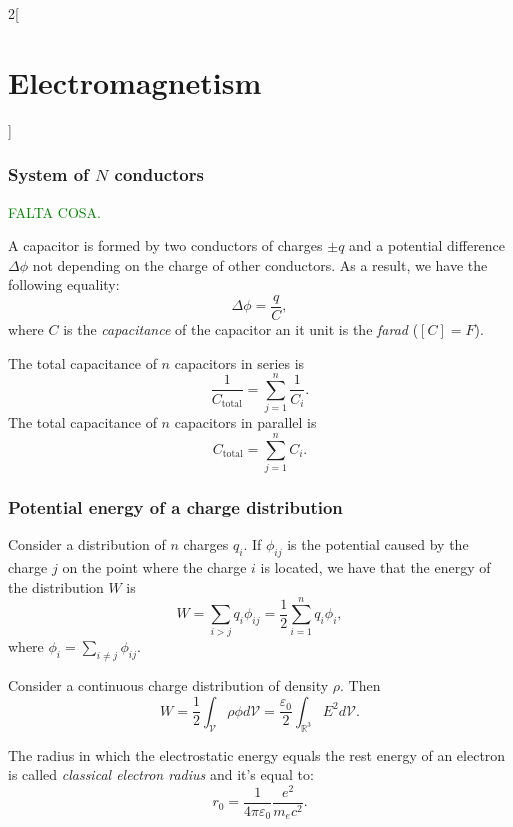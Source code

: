 \documentclass[../../../main.tex]{subfiles}
\begin{document}
\begin{multicols}{2}[\section{Electromagnetism}]
  \subsubsection{System of $N$ conductors}
  \textcolor{green}{FALTA COSA.}
  \begin{definition}[Capacitor]
    A capacitor is formed by two conductors of charges $\pm q$ and a potential difference $\Delta\phi$ not depending on the charge of other conductors. As a result, we have the following equality: $$\Delta\phi=\frac{q}{C},$$ where $C$ is the \textit{capacitance} of the capacitor an it unit is the \textit{farad} ($[C]=F$).
  \end{definition}
  \begin{prop}
    The total capacitance of $n$ capacitors in series is $$\frac{1}{C_\text{total}}=\sum_{j=1}^n\frac{1}{C_i}.$$
    The total capacitance of $n$ capacitors in parallel is $$C_\text{total}=\sum_{j=1}^nC_i.$$
  \end{prop}
  \subsubsection{Potential energy of a charge distribution}
  \begin{prop}
    Consider a distribution of $n$ charges $q_i$. If $\phi_{ij}$ is the potential caused by the charge $j$ on the point where the charge $i$ is located, we have that the energy of the distribution $W$ is $$W=\sum_{i>j}q_i\phi_{ij}=\frac{1}{2}\sum_{i=1}^nq_i\phi_i,$$ where $\displaystyle\phi_i=\sum_{i\ne j}\phi_{ij}$.
  \end{prop}
  \begin{prop}
    Consider a continuous charge distribution of density $\rho$. Then $$W=\frac{1}{2}\int_\mathcal{V}\rho\phi d\mathcal{V}=\frac{\varepsilon_0}{2}\int_{\mathbb{R}^3}E^2d\mathcal{V}.$$
  \end{prop}
  \begin{definition}
    The radius in which the electrostatic energy equals the rest energy of an electron is called \textit{classical electron radius} and it's equal to: $$r_0=\frac{1}{4\pi\varepsilon_0}\frac{e^2}{m_ec^2}.$$
  \end{definition}
\end{multicols}
\end{document}
